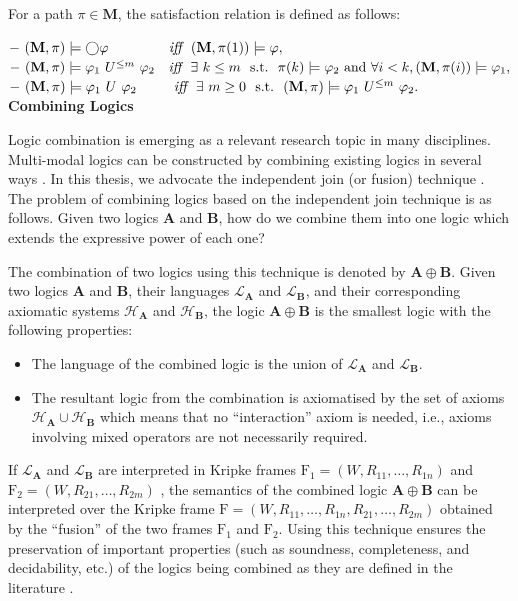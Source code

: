 \noindent For a path $\pi \in \textbf{M}$, the satisfaction relation is defined as follows:

\noindent $-~(\textbf{M},\pi) \models \bigcirc \varphi~~~~~~~~~~~~~\emph{iff}~~(\textbf{M},\pi(1)) \models \varphi,$ \\
$-~(\textbf{M},\pi) \models \varphi_1~U^{\leq  m}~\varphi_2~~~\emph{iff}~~\exists~ k \leq m~~\textrm{s.t.}~~ \pi(k) \models \varphi_2 ~\textrm{and}~\forall i < k, (\textbf{M},\pi(i)) \models \varphi_1,$\\
$-~(\textbf{M},\pi) \models \varphi_1 ~U~\varphi_2~~~~~~~~\emph{iff}~~\exists~ m \geq 0~~\textrm{s.t.}~~(\textbf{M},\pi) \models \varphi_1~U^{\leq m}~\varphi_2.$\\


\noindent \textbf{Combining Logics}

Logic combination is emerging as a relevant research topic in many disciplines. Multi-modal logics can be constructed by combining existing logics in several ways \cite{Gabbay2003}. In this thesis, we advocate the independent join (or fusion) technique \cite{Franceschet2004}. The problem of combining logics based on the independent join technique is as follows. Given two logics $\mathbf{A}$ and $\mathbf{B}$, how do we
combine them into one logic which extends the expressive power of each one?

The combination of two logics using this technique is denoted by $\mathbf{A} \oplus \mathbf{B}$.
Given two logics $\mathbf{A}$ and $\mathbf{B}$, their languages
$\mathcal{L}_\mathbf{A}$ and $\mathcal{L}_\mathbf{B}$, and their corresponding axiomatic systems $\mathcal{H}_\mathbf{A}$ and $\mathcal{H}_\mathbf{B}$, the logic $\mathbf{A} \oplus \mathbf{B}$ is the smallest logic with the following properties:

\begin{itemize}
\item The language of the combined logic is the union of $\mathcal{L}_\mathbf{A}$ and $\mathcal{L}_\mathbf{B}$.
\item The resultant logic from the combination is axiomatised by the set of axioms $\mathcal{H}_\mathbf{A} \cup \mathcal{H}_\mathbf{B}$ which means that no ``interaction'' axiom is needed, i.e., axioms involving mixed operators are not necessarily required.

\end{itemize}


If $\mathcal{L}_\mathbf{A}$ and $\mathcal{L}_\mathbf{B}$ are interpreted in Kripke frames $\mathrm{F}_1 = (W,R_{11}, \dots ,R_{1n})$ and $\mathrm{F}_2 = (W,R_{21}, \dots ,R_{2m})$ , the semantics of the combined logic $\mathbf{A} \oplus \mathbf{B}$  can be interpreted over the Kripke frame $\mathrm{F} = (W,R_{11}, \dots ,R_{1n},R_{21}, \dots, R_{2m})$ obtained by the ``fusion'' of the two frames $\mathrm{F}_1$ and $\mathrm{F}_2$.
Using this technique ensures the preservation of important properties (such as soundness, completeness, and decidability, etc.) of the logics being combined as they are defined in the literature \cite{Konur2013}.




